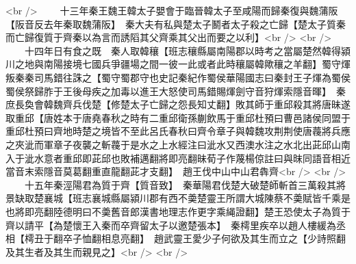 <br />
　　十三年秦王魏王韓太子嬰會于臨晉韓太子至咸陽而歸秦復與魏蒲阪【阪音反去年秦取魏蒲阪】　秦大夫有私與楚太子鬭者太子殺之亡歸【楚太子質秦而亡歸復質于齊秦以為言而誘䧟其父齊乘其父出而要之以利】<br />
<br />
　　十四年日有食之既　秦人取韓穰【班志穰縣屬南陽郡以時考之當屬楚然韓得潁川之地與南陽接境七國兵爭疆場之間一彼一此或者此時穰屬韓歟穰之羊翻】蜀守煇叛秦秦司馬錯往誅之【蜀守蜀郡守也史記秦紀作蜀侯華陽國志曰秦封王子煇為蜀侯蜀侯祭歸胙于王後母疾之加毒以進王大怒使司馬錯賜煇劍守音狩煇索隱音暉】　秦庶長奐會韓魏齊兵伐楚【修楚太子亡歸之怨長知丈翻】敗其師于重邱殺其將唐昧遂取重邱【唐姓本于唐堯春秋之時有二重邱衛孫蒯飲馬于重邱杜預曰曹邑諸侯同盟于重邱杜預曰齊地時楚之境皆不至此呂氏春秋曰齊令章子與韓魏攻荆荆使唐薎將兵應之夾泚而軍章子夜襲之斬薎于是水之上水經注曰泚水又西澳水注之水北出茈邱山南入于泚水意者重邱即茈邱也敗補邁翻將即亮翻昧荀子作蔑楊倞註曰與昩同語音相近當音末索隱音莫葛翻重直龍翻茈才支翻】　趙王伐中山中山君犇齊<br />
<br />
　　十五年秦涇陽君為質于齊【質音致】　秦華陽君伐楚大破楚師斬首三萬殺其將景缺取楚襄城【班志襄城縣屬潁川郡有西不羮楚靈王所謂大城陳蔡不羮賦皆千乘是也將即亮翻陸德明曰不羮舊音郎漢書地理志作更字乘䋲證翻】楚王恐使太子為質于齊以請平【為楚懷王入秦而卒齊留太子以邀楚張本】　秦樗里疾卒以趙人樓緩為丞相【樗丑于翻卒子恤翻相息亮翻】　趙武靈王愛少子何欲及其生而立之【少詩照翻及其生者及其生而親見之】<br />
<br />
